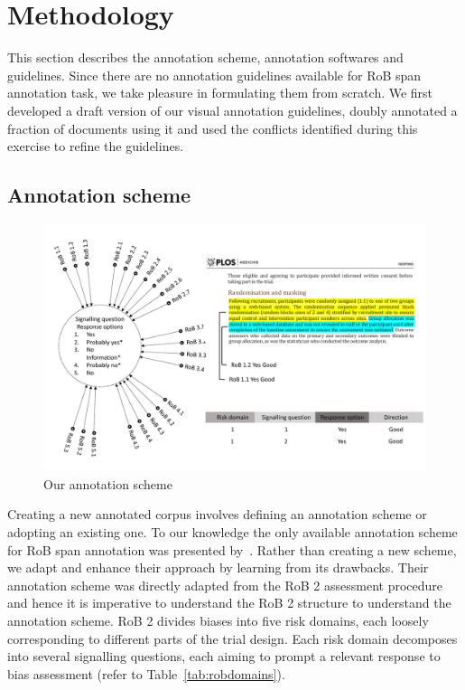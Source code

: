 \documentclass[sn-mathphys,Numbered]{sn-jnl}%
\theoremstyle{thmstyleone}%
\theoremstyle{thmstyletwo}%
\theoremstyle{thmstylethree}%
\begin{document}
\section{Methodology}
\label{sec:methods}
%
This section describes the annotation scheme, annotation softwares and guidelines.
Since there are no annotation guidelines available for RoB span annotation task, we take pleasure in formulating them from scratch. 
We first developed a draft version of our visual annotation guidelines, doubly annotated a fraction of documents using it and used the conflicts identified during this exercise to refine the guidelines.
%
%
%
\subsection{Annotation scheme}
\label{met:annot_scheme}
%

%
%
%
\begin{figure}
    \centering
    \includegraphics[width=0.99\columnwidth]{figures/annotation_schema.pdf}
    \caption{Our annotation scheme}
    \label{fig:annotationscheme}
\end{figure}
%
%
%



Creating a new annotated corpus involves defining an annotation scheme or adopting an existing one.
To our knowledge the only available annotation scheme for RoB span annotation was presented by~\cite{dhrangadhariya2023first}.
Rather than creating a new scheme, we adapt and enhance their approach by learning from its drawbacks.
Their annotation scheme was directly adapted from the RoB 2 assessment procedure and hence it is imperative to understand the RoB 2 structure to understand the annotation scheme.
RoB 2 divides biases into five risk domains, each loosely corresponding to different parts of the trial design.
Each risk domain decomposes into several signalling questions, each aiming to prompt a relevant response to bias assessment (refer to Table~\ref{tab:robdomains}).
\end{document}
